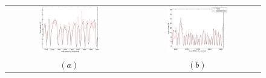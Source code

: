 \documentclass{article}
\begin{document}

\begin{figure}[!ht] \centering
  \begin{tabular}{cc}
    \includegraphics[width=0.50\textwidth]{example_6_one.eps} &
    \includegraphics[width=0.50\textwidth]{example_6_two.eps} \\
    $(a)$ & $(b)$ \\
  \end{tabular}
\end{figure}
\end{document}
